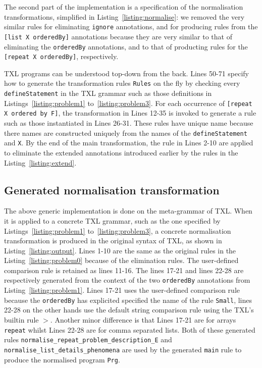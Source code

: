 \documentclass[10pt, conference, compsocconf]{IEEEtran}
\begin{document}
The second part of the implementation is a specification of the normalisation transformations, simplified in Listing~\ref{listing:normalise}: we removed the very similar rules for eliminating {\tt ignore} annotations, and for producing rules from the {\tt [list X orderedBy]} annotations because they are very similar to that of eliminating the {\tt orderedBy} annotations, and to that of producting rules for the {\tt [repeat X orderedBy]}, respectively. 

TXL programs can be understood top-down from the back. Lines 50-71 specify how to generate the transformation rules {\tt Rules} on the fly by checking every {\tt defineStatement} in the TXL grammar such as those definitions in Listings~\ref{listing:problem1} to~\ref{listing:problem3}.  For each occurrence of {\tt [repeat X ordered by F]}, the transformation in Lines 12-35 is invoked to generate a rule such as those instantiated in Lines 26-31. These rules have unique name because there names are constructed uniquely from the names of the {\tt defineStatement} and {\tt X}. By the end of the main transformation, the rule in Lines 2-10 are applied to eliminate the extended annotations introduced earlier by the rules in the Listing~\ref{listing:extend}. 

\subsection{Generated normalisation transformation}
The above generic implementation is done on the meta-grammar of TXL. When it is applied to a concrete TXL grammar, such as the one specified by Listings~\ref{listing:problem1} to~\ref{listing:problem3}, a concrete normalisation transformation is produced in the original syntax of TXL, as shown in Listing~\ref{listing:output}. Lines 1-10 are the same as the original rules in the Listing~\ref{listing:problem0} because of the elimination rules. The user-defined comparison rule is retained as lines 11-16. 
The lines 17-21 and lines 22-28 are respectively generated from the context of the two {\tt orderedBy} annotations from Listing~\ref{listing:problem1}. Lines 17-21 uses the user-defined comparison rule because the {\tt orderedBy} has explicited specified the name of the rule {\tt Small}, lines 22-28 on the other hands use the default string comparison rule using the TXL's builtin rule {\tt $>$}. Another minor difference is that Lines 17-21 are for arrays {\tt repeat} whilst Lines 22-28 are for comma separated lists. Both of these generated rules {\tt normalise\_repeat\_problem\_description\_E} and {\tt normalise\_list\_details\_phenomena} are used by the generated {\tt main} rule to produce the normalised program {\tt Prg}. 
\end{document}
